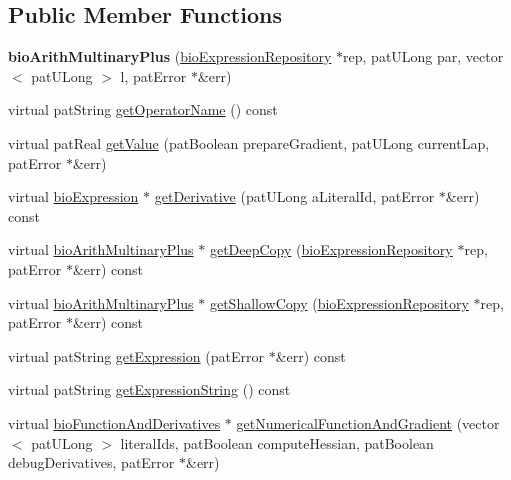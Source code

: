 \subsection*{Public Member Functions}
\begin{DoxyCompactItemize}
\item 
\mbox{\label{classbio_arith_multinary_plus_a7f0c283c8ce8b96d3cc8e023e192b108}} 
{\bfseries bio\+Arith\+Multinary\+Plus} (\hyperlink{classbio_expression_repository}{bio\+Expression\+Repository} $\ast$rep, pat\+U\+Long par, vector$<$ pat\+U\+Long $>$ l, pat\+Error $\ast$\&err)
\item 
virtual pat\+String \hyperlink{classbio_arith_multinary_plus_ac43848551e8c792e9776b7a5e8aef51b}{get\+Operator\+Name} () const
\item 
virtual pat\+Real \hyperlink{classbio_arith_multinary_plus_a90c1c66054e19f52a4424664f7c09d7a}{get\+Value} (pat\+Boolean prepare\+Gradient, pat\+U\+Long current\+Lap, pat\+Error $\ast$\&err)
\item 
virtual \hyperlink{classbio_expression}{bio\+Expression} $\ast$ \hyperlink{classbio_arith_multinary_plus_a6677355df11e314a1729fb7bd79d9188}{get\+Derivative} (pat\+U\+Long a\+Literal\+Id, pat\+Error $\ast$\&err) const
\item 
virtual \hyperlink{classbio_arith_multinary_plus}{bio\+Arith\+Multinary\+Plus} $\ast$ \hyperlink{classbio_arith_multinary_plus_acdd35f59addcdc2e2947fe0d3f594e1f}{get\+Deep\+Copy} (\hyperlink{classbio_expression_repository}{bio\+Expression\+Repository} $\ast$rep, pat\+Error $\ast$\&err) const
\item 
virtual \hyperlink{classbio_arith_multinary_plus}{bio\+Arith\+Multinary\+Plus} $\ast$ \hyperlink{classbio_arith_multinary_plus_a026a46872ed07e51b2a337f45b5086ad}{get\+Shallow\+Copy} (\hyperlink{classbio_expression_repository}{bio\+Expression\+Repository} $\ast$rep, pat\+Error $\ast$\&err) const
\item 
virtual pat\+String \hyperlink{classbio_arith_multinary_plus_a11b1c8e85618101f78dee811b2bf2630}{get\+Expression} (pat\+Error $\ast$\&err) const
\item 
virtual pat\+String \hyperlink{classbio_arith_multinary_plus_a65405ca19730cf4d30c05318f3ab29b0}{get\+Expression\+String} () const
\item 
virtual \hyperlink{classbio_function_and_derivatives}{bio\+Function\+And\+Derivatives} $\ast$ \hyperlink{classbio_arith_multinary_plus_a0ae629f9db89b4697dd2c33719704c31}{get\+Numerical\+Function\+And\+Gradient} (vector$<$ pat\+U\+Long $>$ literal\+Ids, pat\+Boolean compute\+Hessian, pat\+Boolean debug\+Derivatives, pat\+Error $\ast$\&err)
\end{DoxyCompactItemize}
